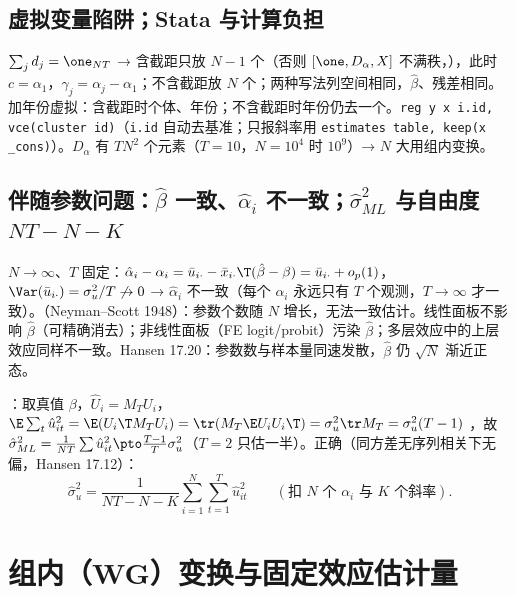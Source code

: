 \subsection{虚拟变量陷阱；Stata 与计算负担}
$\sum_jd_j=\one_{NT}$ → 含截距只放 $N-1$ 个（否则 $[\one,D_\alpha,X]$ 不满秩，），此时 $c=\alpha_1$，$\gamma_j=\alpha_j-\alpha_1$；不含截距放 $N$ 个；两种写法列空间相同，$\hat\beta$、残差相同。加年份虚拟：含截距时个体、年份；不含截距时年份仍去一个。\texttt{reg y x i.id, vce(cluster id)}（\texttt{i.id} 自动去基准；只报斜率用 \texttt{estimates table, keep(x \_cons)}）。$D_\alpha$ 有 $TN^2$ 个元素（$T=10$，$N=10^4$ 时 $10^9$）→ $N$ 大用组内变换。

\subsection{伴随参数问题：\texorpdfstring{$\hat\beta$}{beta-hat} 一致、\texorpdfstring{$\hat\alpha_i$}{alpha\_i-hat} 不一致；\texorpdfstring{$\hat\sigma^2_{ML}$}{sigma2\_ML} 与自由度 \texorpdfstring{$NT-N-K$}{NT-N-K}}
$N\to\infty$、$T$ 固定：$\hat\alpha_i-\alpha_i=\bar u_{i\cdot}-\bar x_{i\cdot}\T(\hat\beta-\beta)=\bar u_{i\cdot}+o_p(1)$，$\Var(\bar u_{i\cdot})=\sigma_u^2/T\not\to0$ → $\hat\alpha_i$ 不一致（每个 $\alpha_i$ 永远只有 $T$ 个观测，$T\to\infty$ 才一致）。（Neyman–Scott 1948）：参数个数随 $N$ 增长，无法一致估计。线性面板不影响 $\hat\beta$（可精确消去）；非线性面板（FE logit/probit）污染 $\hat\beta$；多层效应中的上层效应同样不一致。Hansen 17.20：参数数与样本量同速发散，$\hat\beta$ 仍 $\sqrt N$ 渐近正态。

：取真值 $\beta$，$\hat U_i=M_TU_i$，$\E\sum_t\hat u_{it}^2=\E(U_i\T M_TU_i)=\tr(M_T\E U_iU_i\T)=\sigma_u^2\tr M_T=\sigma_u^2(T-1)$ ，故 $\hat\sigma^2_{ML}=\frac1{NT}\sum\hat u_{it}^2\pto\frac{T-1}{T}\sigma_u^2$（$T=2$ 只估一半）。正确（同方差无序列相关下无偏，Hansen 17.12）：
\begin{equation}\label{eq:QU10a-s2}
\hat\sigma_u^2=\frac{1}{NT-N-K}\sum_{i=1}^N\sum_{t=1}^T\hat u_{it}^2\qquad(\text{扣 $N$ 个 $\alpha_i$ 与 $K$ 个斜率}).
\end{equation}

\section{组内（WG）变换与固定效应估计量}\label{sec:QU10a-wg}

